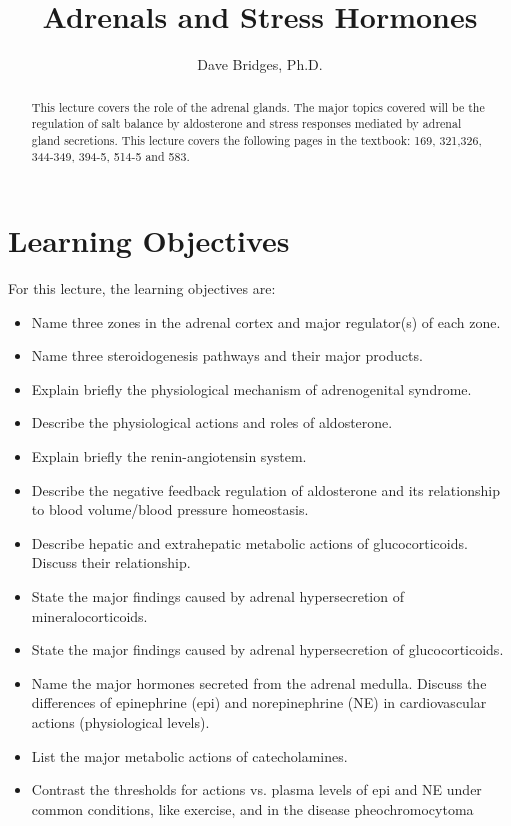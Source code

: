 \documentclass{tufte-handout}
\title{Adrenals and Stress Hormones}
\author{Dave Bridges, Ph.D.}
\begin{document}
\maketitle%

\begin{abstract}
\noindent This lecture covers the role of the adrenal glands.  The major topics covered will be the regulation of salt balance by aldosterone and stress responses mediated by adrenal gland secretions.  This lecture covers the following pages in the textbook: 169, 321,326, 344-349, 394-5, 514-5 and 583\cite{Widmaier2013}.
\end{abstract}

\tableofcontents

\pagebreak

\section{Learning Objectives}
For this lecture, the learning objectives are:
\begin{itemize}
\item Name three zones in the adrenal cortex and major regulator(s) of each zone.
\item Name three steroidogenesis pathways and their major products.
\item Explain briefly the physiological mechanism of adrenogenital syndrome.
\item Describe the physiological actions and roles of aldosterone.
\item Explain briefly the renin-angiotensin system.
\item Describe the negative feedback regulation of aldosterone and its relationship to blood volume/blood pressure homeostasis.
\item Describe hepatic and extrahepatic metabolic actions of glucocorticoids. Discuss their relationship.
\item State the major findings caused by adrenal hypersecretion of mineralocorticoids.
\item State the major findings caused by adrenal hypersecretion of glucocorticoids.
\item Name the major hormones secreted from the adrenal medulla. Discuss the differences of epinephrine (epi) and norepinephrine (NE) in cardiovascular actions (physiological levels). 
\item List the major metabolic actions of catecholamines.
\item Contrast the thresholds for actions vs. plasma levels of epi and NE under common conditions, like exercise, and in the disease pheochromocytoma

\end{itemize}
\end{document}
